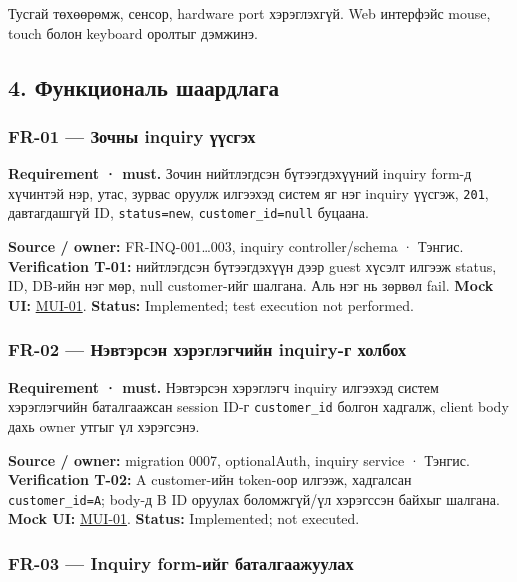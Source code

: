\documentclass[
  mongolian,
]{article}
\begin{document}
Тусгай төхөөрөмж, сенсор, hardware port хэрэглэхгүй. Web интерфэйс
mouse, touch болон keyboard оролтыг дэмжинэ.

\subsection{4. Функциональ
шаардлага}\label{ux444ux443ux43dux43aux446ux438ux43eux43dux430ux43bux44c-ux448ux430ux430ux440ux434ux43bux430ux433ux430}

\subsubsection{FR-01 --- Зочны inquiry
үүсгэх}\label{fr-01-ux437ux43eux447ux43dux44b-inquiry-ux4afux4afux441ux433ux44dux445}

\textbf{Requirement · must.} Зочин нийтлэгдсэн бүтээгдэхүүний inquiry
form-д хүчинтэй нэр, утас, зурвас оруулж илгээхэд систем яг нэг inquiry
үүсгэж, \texttt{201}, давтагдашгүй ID, \texttt{status=new},
\texttt{customer\_id=null} буцаана.

\textbf{Source / owner:} FR-INQ-001\ldots003, inquiry controller/schema
· Тэнгис. \textbf{Verification T-01:} нийтлэгдсэн бүтээгдэхүүн дээр
guest хүсэлт илгээж status, ID, DB-ийн нэг мөр, null customer-ийг
шалгана. Аль нэг нь зөрвөл fail. \textbf{Mock UI:}
\href{../assets/01-inquiry-form.png}{MUI-01}. \textbf{Status:}
Implemented; test execution not performed.

\subsubsection{FR-02 --- Нэвтэрсэн хэрэглэгчийн inquiry-г
холбох}\label{fr-02-ux43dux44dux432ux442ux44dux440ux441ux44dux43d-ux445ux44dux440ux44dux433ux43bux44dux433ux447ux438ux439ux43d-inquiry-ux433-ux445ux43eux43bux431ux43eux445}

\textbf{Requirement · must.} Нэвтэрсэн хэрэглэгч inquiry илгээхэд систем
хэрэглэгчийн баталгаажсан session ID-г \texttt{customer\_id} болгон
хадгалж, client body дахь owner утгыг үл хэрэгсэнэ.

\textbf{Source / owner:} migration 0007, optionalAuth, inquiry service ·
Тэнгис. \textbf{Verification T-02:} A customer-ийн token-оор илгээж,
хадгалсан \texttt{customer\_id=A}; body-д B ID оруулах боломжгүй/үл
хэрэгссэн байхыг шалгана. \textbf{Mock UI:}
\href{../assets/01-inquiry-form.png}{MUI-01}. \textbf{Status:}
Implemented; not executed.

\subsubsection{FR-03 --- Inquiry form-ийг
баталгаажуулах}\label{fr-03-inquiry-form-ux438ux439ux433-ux431ux430ux442ux430ux43bux433ux430ux430ux436ux443ux443ux43bux430ux445}
\end{document}
